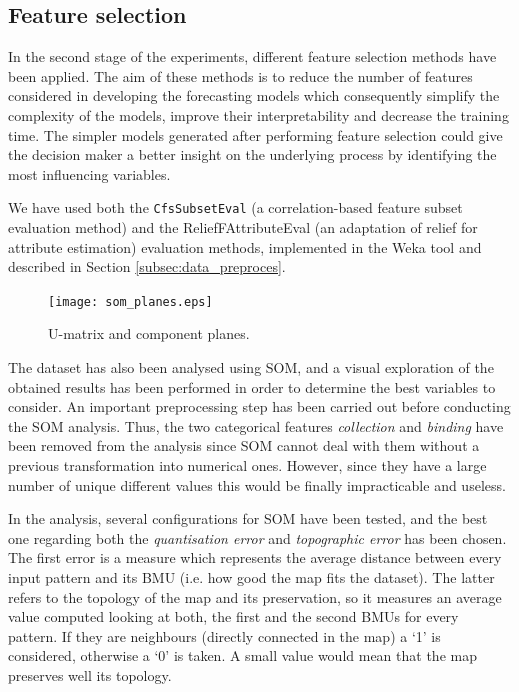 \documentclass[a4paper,10pt,twocolumn,preprint,3p]{elsarticle}
\begin{document}

\subsection{Feature selection}
\label{subsec:feature_selection}

In the second stage of the experiments, different feature selection methods have been applied. The aim of these methods is to reduce the number of features considered in developing the forecasting models which consequently simplify the complexity of the models, improve their interpretability and decrease the training time. The simpler models generated after performing feature selection could give the decision maker a better insight on the underlying process by identifying the most influencing variables. 
  
We have used both the {\tt CfsSubsetEval} \cite{Hall1998} (a correlation-based feature subset evaluation method) and the ReliefFAttributeEval \cite{RobnikSikonja1997} (an adaptation of relief for attribute estimation) evaluation methods, implemented in the Weka tool and described in Section \ref{subsec:data_preproces}.


\begin{figure}[ht]
\begin{center}
\texttt{[image: som\_planes.eps]}
\end{center}
\caption{U-matrix and component planes.}
\label{fig:componentplanes}
\end{figure}



The dataset has also been analysed using SOM, and a visual exploration of the obtained results has been performed in order to determine the best variables to consider.
An important preprocessing step has been carried out before conducting the SOM analysis. Thus, the two categorical features \emph{collection} and \emph{binding} have been removed from the analysis since SOM cannot deal with them without a previous transformation into numerical ones. However, since they have a large number of unique different values this would be finally impracticable and useless. 

In the analysis, several configurations for SOM have been tested, and the best one regarding both the \textit{quantisation error} and \textit{topographic error} has been chosen. The first error is a measure which represents the average distance between every input pattern and its BMU (i.e. how good the map fits the dataset). The latter refers to the topology of the map and its preservation, so it measures an average value computed looking at both, the first and the second BMUs for every pattern. If they are neighbours (directly connected in the map) a `1' is considered, otherwise a `0' is taken. A small value would mean that the map preserves well its topology.
\end{document}
